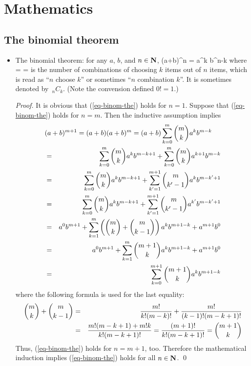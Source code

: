 
\chapter{Mathematics}
\label{app-math}

\section{The binomial theorem}

\begin{itemize}
	\item The binomial theorem:
	for any $a$, $b$, and $n\in{\mbox{\bf N}}$,
		(a+b)^n =   a^k b^{n-k}
	\eeql
	where
		 = 
		= 
	\eeql
	is the number of combinations
	of choosing $k$ items out of $n$ items,
	which is read as ``$n$ choose $k$'' or sometimes ``$n$ combination $k$''.
	It is sometimes denoted by $\,_nC_k$.
	(Note the convension defined $0!=1$.)
	\begin{proof}
		It is obvious that (\ref{eq-binom-the}) holds for $n=1$.
		Suppose that (\ref{eq-binom-the}) holds for $n=m$.
		Then the inductive assumption implies
		\begin{eqnarray*}
			\lefteqn{
			(a+b)^{m+1} = (a+b) (a+b)^m
			= (a+b) \sumto{k}{0}{m} \chs{m}{k} a^k b^{m-k}
			}
			\\ &=&
			\sumto{k}{0}{m} \chs{m}{k} a^k b^{m-k+1}
			+ \sumto{k}{0}{m} \chs{m}{k} a^{k+1} b^{m-k}
			\\ &=&
			\sumto{k}{0}{m} \chs{m}{k} a^k b^{m-k+1}
			+ \sumto{k'}{1}{m+1} \chs{m}{k'-1} a^{k} b^{m-k'+1}
			\\ &=&
			\sumto{k}{0}{m} \chs{m}{k} a^k b^{m-k+1}
			+ \sumto{k'}{1}{m+1} \chs{m}{k'-1} a^{k'} b^{m-k'+1}
			\\ &=&
			a^0b^{m+1}
			+ \sumto{k}{1}{m} \left( \chs{m}{k} + \chs{m}{k-1} \right) a^{k} b^{m+1-k}
			+ a^{m+1} b^0
			\\ &=&
			a^0b^{m+1}
			+ \sumto{k}{1}{m} \chs{m+1}{k} a^{k} b^{m+1-k}
			+ a^{m+1} b^0
			\\ &=&
			\sumto{k}{0}{m+1} \chs{m+1}{k} a^{k} b^{m+1-k}
		\end{eqnarray*}
		where the following formula is used for the last equality:
		\begin{eqnarray*}
			{{m} \choose {k}} + {{m} \choose {k-1}}
			&=& \frac{m!}{k!(m-k)!} + \frac{m!}{(k-1)!(m-k+1)!}
			\\&=&
			 \frac{m!(m-k+1)+ m!k}{k!(m-k+1)!}
			= \frac{(m+1)!}{k!(m-k+1)!}
			= {{m+1} \choose {k}}
		\end{eqnarray*}
		Thus, (\ref{eq-binom-the}) holds for $n=m+1$, too.
		Therefore the mathematical induction implies
		(\ref{eq-binom-the}) holds for all $n\in{\mbox{\bf N}}$.
		\qed
	\end{proof}


\end{itemize}
